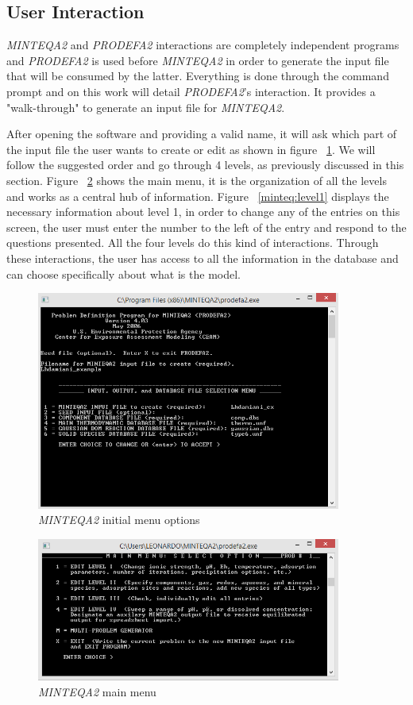 \subsection{User Interaction}\label{minteq:interactions}
\emph{MINTEQA2} and \emph{PRODEFA2} interactions are completely independent programs and \emph{PRODEFA2} is used before \emph{MINTEQA2} in order to generate the input file that will be consumed by the latter. Everything is done through the command prompt and on this work will detail \emph{PRODEFA2}'s interaction. It provides a "walk-through" to generate an input file for \emph{MINTEQA2}.

After opening the software and providing a valid name, it will ask which part of the input file the user wants to create or edit as shown in figure ~\ref{minteq:init}. We will follow the suggested order and go through 4 levels, as previously discussed in this section. Figure ~\ref{minteq:level0} shows the main menu, it is the organization of all the levels and works as a central hub of information. Figure ~\ref{minteq:level1} displays the necessary information about level 1,     in order to change any of the entries on this screen, the user must enter the number to the left of the entry and respond to the questions presented. All the four levels do this kind of interactions. Through these interactions, the user has access to all the information in the database and can choose specifically about what is the model.

\begin{figure}[ht!]
\centering
\includegraphics[width=100mm]{figures/minteq-init.png}
\caption{\emph{MINTEQA2} initial menu options}
\label{minteq:init}
\end{figure}

\begin{figure}[ht!]
\centering
\includegraphics[width=100mm]{figures/minteq-level0.png}
\caption{\emph{MINTEQA2} main menu}
\label{minteq:level0}
\end{figure}


